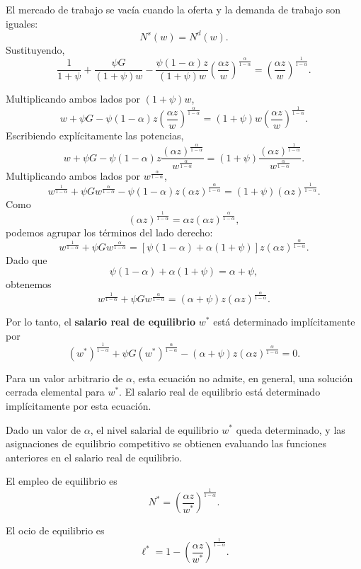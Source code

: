 \documentclass[11pt]{article}
\begin{document}
El mercado de trabajo se vacía cuando la oferta y la demanda de trabajo son
iguales:
\[
N^s(w)=N^d(w).
\]
Sustituyendo,
\[
\frac{1}{1+\psi}
+
\frac{\psi G}{(1+\psi)w}
-
\frac{\psi(1-\alpha)z}{(1+\psi)w}
\left(
\frac{\alpha z}{w}
\right)^{\frac{\alpha}{1-\alpha}}
=
\left(
\frac{\alpha z}{w}
\right)^{\frac{1}{1-\alpha}}.
\]

Multiplicando ambos lados por $(1+\psi)w$,
\[
w+\psi G
-
\psi(1-\alpha)z
\left(
\frac{\alpha z}{w}
\right)^{\frac{\alpha}{1-\alpha}}
=
(1+\psi)w
\left(
\frac{\alpha z}{w}
\right)^{\frac{1}{1-\alpha}}.
\]
Escribiendo explícitamente las potencias,
\[
w+\psi G
-
\psi(1-\alpha)z
\frac{(\alpha z)^{\frac{\alpha}{1-\alpha}}}
{w^{\frac{\alpha}{1-\alpha}}}
=
(1+\psi)
\frac{(\alpha z)^{\frac{1}{1-\alpha}}}
{w^{\frac{\alpha}{1-\alpha}}}.
\]
Multiplicando ambos lados por
$w^{\frac{\alpha}{1-\alpha}}$,
\[
w^{\frac{1}{1-\alpha}}
+
\psi G
w^{\frac{\alpha}{1-\alpha}}
-
\psi(1-\alpha)z
(\alpha z)^{\frac{\alpha}{1-\alpha}}
=
(1+\psi)
(\alpha z)^{\frac{1}{1-\alpha}}.
\]
Como
\[
(\alpha z)^{\frac{1}{1-\alpha}}
=
\alpha z
(\alpha z)^{\frac{\alpha}{1-\alpha}},
\]
podemos agrupar los términos del lado derecho:
\[
w^{\frac{1}{1-\alpha}}
+
\psi G
w^{\frac{\alpha}{1-\alpha}}
=
\left[
\psi(1-\alpha)+\alpha(1+\psi)
\right]
z
(\alpha z)^{\frac{\alpha}{1-\alpha}}.
\]
Dado que
\[
\psi(1-\alpha)+\alpha(1+\psi)
=
\alpha+\psi,
\]
obtenemos
\[
\boxed{
w^{\frac{1}{1-\alpha}}
+
\psi G
w^{\frac{\alpha}{1-\alpha}}
=
(\alpha+\psi)z
(\alpha z)^{\frac{\alpha}{1-\alpha}}
}.
\]

Por lo tanto, el \textbf{salario real de equilibrio} $w^*$ está determinado implícitamente por
\[
\boxed{
(w^*)^{\frac{1}{1-\alpha}}
+
\psi G
(w^*)^{\frac{\alpha}{1-\alpha}}
-
(\alpha+\psi)z
(\alpha z)^{\frac{\alpha}{1-\alpha}}
=
0
}.
\]

Para un valor arbitrario de $\alpha$, esta ecuación no admite, en general, una solución cerrada elemental para $w^*$. El salario real de equilibrio está determinado implícitamente por esta ecuación.

Dado un valor de $\alpha$, el nivel salarial de equilibrio $w^*$ queda determinado, y las asignaciones de equilibrio competitivo se obtienen evaluando las funciones anteriores en el salario real de equilibrio.

El empleo de equilibrio es
\[
\boxed{
N^*
=
\left(
\frac{\alpha z}{w^*}
\right)^{\frac{1}{1-\alpha}}
}.
\]

El ocio de equilibrio es
\[
\boxed{
\ell^*
=
1-
\left(
\frac{\alpha z}{w^*}
\right)^{\frac{1}{1-\alpha}}
}.
\]
\end{document}
